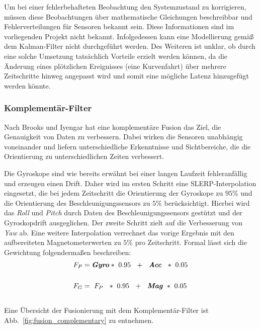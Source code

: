 Um bei einer fehlerbehafteten Beobachtung den Systemzustand zu korrigieren, müssen diese Beobachtungen über mathematische Gleichungen beschreibbar und Fehlerverteilungen für Sensoren bekannt sein.
Diese Informationen sind im vorliegenden Projekt nicht bekannt.
Infolgedessen kann eine Modellierung gemäß dem Kalman-Filter nicht durchgeführt werden. 
Des Weiteren ist unklar, ob durch eine solche Umsetzung tatsächlich Vorteile erzielt werden können, da die Änderung eines plötzlichen Ereignisses (\zB eine Kurvenfahrt) über mehrere Zeitschritte hinweg angepasst wird und somit eine mögliche Latenz hinzugefügt werden könnte.

\subsubsection{Komplementär-Filter}
Nach Brooks und Iyengar \cite{Brooks.1998} hat eine komplementäre Fusion das Ziel, die Genauigkeit von Daten zu verbessern. 
Dabei wirken die Sensoren unabhängig voneinander und liefern unterschiedliche Erkenntnisse und Sichtbereiche, die die Orientierung zu unterschiedlichen Zeiten verbessert.

Die Gyroskope sind wie bereits erwähnt bei einer langen Laufzeit fehleranfällig und erzeugen einen Drift. 
Daher wird im ersten Schritt eine \ac{SLERP}-Interpolation eingesetzt, die bei jedem Zeitschritt die Orientierung der Gyroskope zu $95\%$ und die Orientierung des Beschleunigungssensors zu $5\%$ berücksichtigt.
Hierbei wird das \emph{Roll} und \emph{Pitch} durch Daten des Beschleunigungssensors gestützt und der Gyroskopdrift ausgeglichen.
Der zweite Schritt zielt auf die Verbesserung von \emph{Yaw} ab.
Eine weitere Interpolation verrechnet das vorige Ergebnis mit den aufbereiteten Magnetometerwerten zu $5\%$ pro Zeitschritt.
Formal lässt sich die Gewichtung folgendermaßen beschreiben:
\\
\begin{align}
F_P &= \textbf{\textit{Gyro}}*~0.95~~+~~\textbf{\textit{Acc}}~~*~0.05\\
\notag\\
F_G &= ~F_P~~*~0.95~~+~~\textbf{\textit{Mag}}~*~0.05
\end{align}
\\
Eine Übersicht der Fusionierung mit dem Komplementär-Filter ist Abb.~\ref{fig:fusion_complementary} zu entnehmen.

